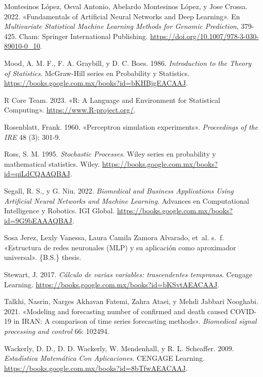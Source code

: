 \documentclass[
  us-letterpaper,
]{scrreprt}
\newlength{\cslhangindent}
\newenvironment{CSLReferences}[2] %
 {\begin{list}{}{%
  \setlength{\itemindent}{0pt}
  \setlength{\leftmargin}{0pt}
  \setlength{\parsep}{0pt}
  \ifodd #1
   \setlength{\leftmargin}{\cslhangindent}
   \setlength{\itemindent}{-1\cslhangindent}
  \fi
  \setlength{\itemsep}{#2\baselineskip}}}
 {\end{list}}
\theoremstyle{plain}
\theoremstyle{definition}
\theoremstyle{plain}
\theoremstyle{definition}
\theoremstyle{remark}
\begin{document}
\begin{CSLReferences}{1}{0}
Montesinos López, Osval Antonio, Abelardo Montesinos López, y Jose
Crossa. 2022. {«Fundamentals of Artificial Neural Networks and Deep
Learning»}. En \emph{Multivariate Statistical Machine Learning Methods
for Genomic Prediction}, 379-425. Cham: Springer International
Publishing. \url{https://doi.org/10.1007/978-3-030-89010-0_10}.

Mood, A. M. F., F. A. Graybill, y D. C. Boes. 1986. \emph{Introduction
to the Theory of Statistics}. McGraw-Hill series en Probability y
Statistics. \url{https://books.google.com.mx/books?id=bKHBjgEACAAJ}.

R Core Team. 2023. {«R: A Language and Environment for Statistical
Computing»}. \url{https://www.R-project.org/}.

Rosenblatt, Frank. 1960. {«Perceptron simulation experiments»}.
\emph{Proceedings of the IRE} 48 (3): 301-9.

Ross, S. M. 1995. \emph{Stochastic Processes}. Wiley series en
probability y mathematical statistics. Wiley.
\url{https://books.google.com.mx/books?id=qiLdCQAAQBAJ}.

Segall, R. S., y G. Niu. 2022. \emph{Biomedical and Business
Applications Using Artificial Neural Networks and Machine Learning}.
Advances en Computational Intelligence y Robotics. IGI Global.
\url{https://books.google.com.mx/books?id=9G9bEAAAQBAJ}.

Sosa Jerez, Lexly Vanessa, Laura Camila Zamora Alvarado, et~al. s.~f.
{«Estructura de redes neuronales (MLP) y su aplicaci{ó}n como
aproximador universal»}. \{B.S.\} thesis.

Stewart, J. 2017. \emph{C{á}lculo de varias variables: trascendentes
tempranas}. Cengage Learning.
\url{https://books.google.com.mx/books?id=bKSvtAEACAAJ}.

Talkhi, Nasrin, Narges Akhavan Fatemi, Zahra Ataei, y Mehdi Jabbari
Nooghabi. 2021. {«Modeling and forecasting number of confirmed and death
caused COVID-19 in IRAN: A comparison of time series forecasting
methods»}. \emph{Biomedical signal processing and control} 66: 102494.

Wackerly, D. D., D. D. Wackerly, W. Mendenhall, y R. L. Scheaffer. 2009.
\emph{Estad{ı́}stica Matem{á}tica Con Aplicaciones}. CENGAGE Learning.
\url{https://books.google.com.mx/books?id=8bTfwAEACAAJ}.


\end{CSLReferences}
\end{document}
